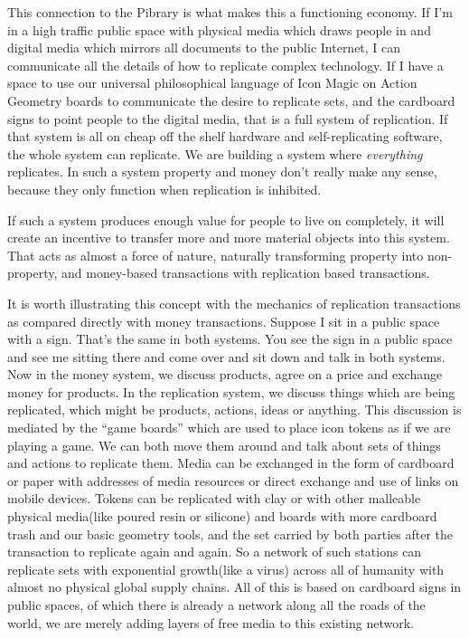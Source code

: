 This connection to the Pibrary is what makes this a functioning economy.
If I'm in a high traffic public space with physical media which draws
people in and digital media which mirrors all documents to the public
Internet, I can communicate all the details of how to replicate complex
technology. If I have a space to use our universal philosophical
language of Icon Magic on Action Geometry boards to communicate the
desire to replicate sets, and the cardboard signs to point people to the
digital media, that is a full system of replication. If that system is
all on cheap off the shelf hardware and self-replicating software, the
whole system can replicate. We are building a system where
\emph{everything} replicates. In such a system property and money don't
really make any sense, because they only function when replication is
inhibited.

If such a system produces enough value for people to live on completely,
it will create an incentive to transfer more and more material objects
into this system. That acts as almost a force of nature, naturally
transforming property into non-property, and money-based transactions
with replication based transactions.

It is worth illustrating this concept with the mechanics of replication
transactions as compared directly with money transactions. Suppose I sit
in a public space with a sign. That's the same in both systems. You see
the sign in a public space and see me sitting there and come over and
sit down and talk in both systems. Now in the money system, we discuss
products, agree on a price and exchange money for products. In the
replication system, we discuss things which are being replicated, which
might be products, actions, ideas or anything. This discussion is
mediated by the ``game boards'' which are used to place icon tokens as
if we are playing a game. We can both move them around and talk about
sets of things and actions to replicate them. Media can be exchanged in
the form of cardboard or paper with addresses of media resources or
direct exchange and use of links on mobile devices. Tokens can be
replicated with clay or with other malleable physical media(like poured
resin or silicone) and boards with more cardboard trash and our basic
geometry tools, and the set carried by both parties after the
transaction to replicate again and again. So a network of such stations
can replicate sets with exponential growth(like a virus) across all of
humanity with almost no physical global supply chains. All of this is
based on cardboard signs in public spaces, of which there is already a
network along all the roads of the world, we are merely adding layers of
free media to this existing network.

